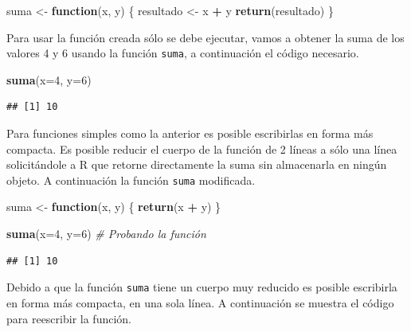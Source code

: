 \documentclass[10pt,]{krantz}
\makeatletter
\newenvironment{Shaded}{\begin{snugshade}}{\end{snugshade}}
\newcommand{\KeywordTok}[1]{\textcolor[rgb]{0.13,0.29,0.53}{\textbf{#1}}}
\newcommand{\DataTypeTok}[1]{\textcolor[rgb]{0.13,0.29,0.53}{#1}}
\newcommand{\DecValTok}[1]{\textcolor[rgb]{0.00,0.00,0.81}{#1}}
\newcommand{\StringTok}[1]{\textcolor[rgb]{0.31,0.60,0.02}{#1}}
\newcommand{\CommentTok}[1]{\textcolor[rgb]{0.56,0.35,0.01}{\textit{#1}}}
\newcommand{\ControlFlowTok}[1]{\textcolor[rgb]{0.13,0.29,0.53}{\textbf{#1}}}
\newcommand{\OperatorTok}[1]{\textcolor[rgb]{0.81,0.36,0.00}{\textbf{#1}}}
\newcommand{\NormalTok}[1]{#1}
\let\proglang=\textsf
\newenvironment{kframe}{%
\medskip{}
\setlength{\fboxsep}{.8em}
 \def\at@end@of@kframe{}%
 \ifinner\ifhmode%
  \def\at@end@of@kframe{\end{minipage}}%
  \begin{minipage}{\columnwidth}%
 \fi\fi%
 \def\FrameCommand##1{\hskip\@totalleftmargin \hskip-\fboxsep
 \colorbox{shadecolor}{##1}\hskip-\fboxsep
     \hskip-\linewidth \hskip-\@totalleftmargin \hskip\columnwidth}%
 \MakeFramed {\advance\hsize-\width
   \@totalleftmargin\z@ \linewidth\hsize
   \@setminipage}}%
 {\par\unskip\endMakeFramed%
 \at@end@of@kframe}
\renewenvironment{Shaded}{\begin{kframe}}{\end{kframe}}
\makeatother
\begin{document}
\begin{Shaded}
\begin{Highlighting}[]
\NormalTok{suma <-}\StringTok{ }\ControlFlowTok{function}\NormalTok{(x, y) \{}
\NormalTok{  resultado <-}\StringTok{ }\NormalTok{x }\OperatorTok{+}\StringTok{ }\NormalTok{y}
  \KeywordTok{return}\NormalTok{(resultado)}
\NormalTok{\}}
\end{Highlighting}
\end{Shaded}

Para usar la función creada sólo se debe ejecutar, vamos a obtener la
suma de los valores 4 y 6 usando la función \texttt{suma}, a
continuación el código necesario.

\begin{Shaded}
\begin{Highlighting}[]
\KeywordTok{suma}\NormalTok{(}\DataTypeTok{x=}\DecValTok{4}\NormalTok{, }\DataTypeTok{y=}\DecValTok{6}\NormalTok{)}
\end{Highlighting}
\end{Shaded}

\begin{verbatim}
## [1] 10
\end{verbatim}

Para funciones simples como la anterior es posible escribirlas en forma
más compacta. Es posible reducir el cuerpo de la función de 2 líneas a
sólo una línea solicitándole a \proglang{R} que retorne directamente la
suma sin almacenarla en ningún objeto. A continuación la función
\texttt{suma} modificada.

\begin{Shaded}
\begin{Highlighting}[]
\NormalTok{suma <-}\StringTok{ }\ControlFlowTok{function}\NormalTok{(x, y) \{}
  \KeywordTok{return}\NormalTok{(x }\OperatorTok{+}\StringTok{ }\NormalTok{y)}
\NormalTok{\}}

\KeywordTok{suma}\NormalTok{(}\DataTypeTok{x=}\DecValTok{4}\NormalTok{, }\DataTypeTok{y=}\DecValTok{6}\NormalTok{)  }\CommentTok{# Probando la función}
\end{Highlighting}
\end{Shaded}

\begin{verbatim}
## [1] 10
\end{verbatim}

Debido a que la función \texttt{suma} tiene un cuerpo muy reducido es
posible escribirla en forma más compacta, en una sola línea. A
continuación se muestra el código para reescribir la función.
\end{document}

